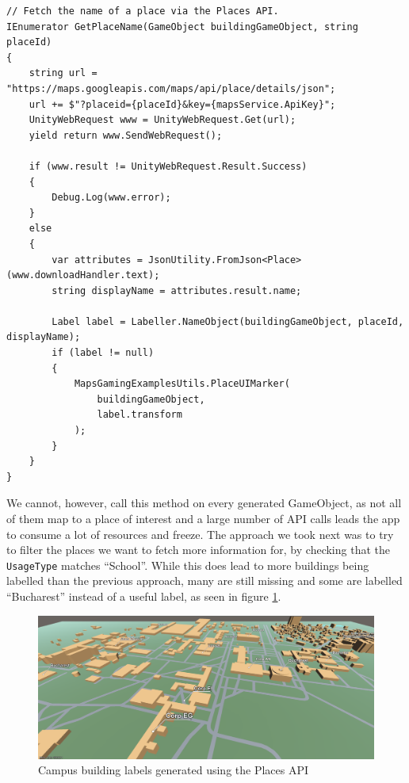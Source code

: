             \begin{verbatim}
// Fetch the name of a place via the Places API.
IEnumerator GetPlaceName(GameObject buildingGameObject, string placeId)
{
    string url = "https://maps.googleapis.com/maps/api/place/details/json";
    url += $"?placeid={placeId}&key={mapsService.ApiKey}";
    UnityWebRequest www = UnityWebRequest.Get(url);
    yield return www.SendWebRequest();
 
    if (www.result != UnityWebRequest.Result.Success)
    {
        Debug.Log(www.error);
    }
    else
    {
        var attributes = JsonUtility.FromJson<Place>(www.downloadHandler.text);
        string displayName = attributes.result.name;
 
        Label label = Labeller.NameObject(buildingGameObject, placeId, displayName);
        if (label != null)
        {
            MapsGamingExamplesUtils.PlaceUIMarker(
                buildingGameObject,
                label.transform
            );
        }
    }
}
            \end{verbatim}
            
            We cannot, however, call this method on every generated GameObject, as not all of them map to a place of interest and a large number of API calls leads the app to consume a lot of resources and freeze. The approach we took next was to try to filter the places we want to fetch more information for, by checking that the \texttt{UsageType} matches “School”. While this does lead to more buildings being labelled than the previous approach, many are still missing and some are labelled “Bucharest” instead of a useful label, as seen in figure \ref{3:fig:maps_sdk_for_unity_labels_places_api}.
            
            \begin{figure}[ht]
                \centering
                \includegraphics[width=\textwidth]{figures/demos/maps_sdk_for_unity_labels_places_api.png}
                \caption{Campus building labels generated using the Places API}
                \label{3:fig:maps_sdk_for_unity_labels_places_api}
            \end{figure}
            
